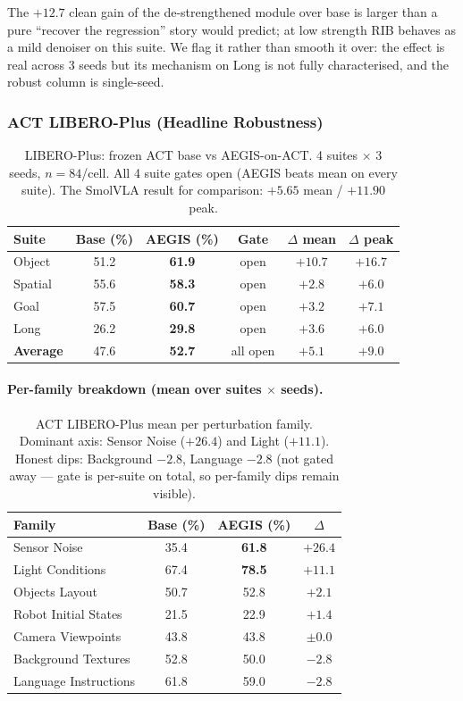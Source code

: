 \documentclass[11pt,a4paper]{article}
\newcommand{\win}[1]{{\color{frozengreen}\textbf{#1}}}
\begin{document}
\noindent The $+12.7$ clean gain of the de-strengthened module over base is larger than a pure
``recover the regression'' story would predict; at low strength RIB behaves as a mild denoiser
on this suite. We flag it rather than smooth it over: the effect is real across 3 seeds but its
mechanism on Long is not fully characterised, and the robust column is single-seed.

\subsubsection{ACT LIBERO-Plus (Headline Robustness)}

\begin{table}[H]
\centering
\caption{LIBERO-Plus: frozen ACT base vs AEGIS-on-ACT. 4 suites $\times$ 3 seeds,
$n=84$/cell. All 4 suite gates open (AEGIS beats mean on every suite).
The SmolVLA result for comparison: $+5.65$ mean / $+11.90$ peak.}
\label{tab:act_lplus}
\small
\begin{tabular}{lccccc}
\toprule
Suite & Base (\%) & AEGIS (\%) & Gate & $\Delta$ mean & $\Delta$ peak \\
\midrule
Object  & 51.2 & \win{61.9} & open & $+10.7$ & $+16.7$ \\
Spatial & 55.6 & \win{58.3} & open & $+2.8$  & $+6.0$ \\
Goal    & 57.5 & \win{60.7} & open & $+3.2$  & $+7.1$ \\
Long    & 26.2 & \win{29.8} & open & $+3.6$  & $+6.0$ \\
\midrule
\textbf{Average} & 47.6 & \win{52.7} & all open & $+5.1$ & $+9.0$ \\
\bottomrule
\end{tabular}
\end{table}

\paragraph{Per-family breakdown (mean over suites $\times$ seeds).}

\begin{table}[H]
\centering
\caption{ACT LIBERO-Plus mean per perturbation family. Dominant axis: Sensor Noise
($+26.4$) and Light ($+11.1$). Honest dips: Background $-2.8$, Language $-2.8$
(not gated away — gate is per-suite on total, so per-family dips remain visible).}
\small
\begin{tabular}{lccc}
\toprule
Family & Base (\%) & AEGIS (\%) & $\Delta$ \\
\midrule
Sensor Noise         & 35.4 & \win{61.8} & $+26.4$ \\
Light Conditions     & 67.4 & \win{78.5} & $+11.1$ \\
Objects Layout       & 50.7 & 52.8 & $+2.1$ \\
Robot Initial States & 21.5 & 22.9 & $+1.4$ \\
Camera Viewpoints    & 43.8 & 43.8 & $\pm 0.0$ \\
Background Textures  & 52.8 & 50.0 & $-2.8$ \\
Language Instructions& 61.8 & 59.0 & $-2.8$ \\
\bottomrule
\end{tabular}
\end{table}
\end{document}
